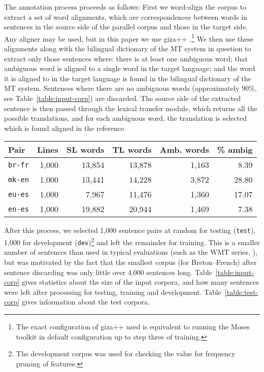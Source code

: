 \documentclass[11pt]{article}
\begin{document}
The annotation process proceeds as follows: First we word-align the
corpus to extract a set of word alignments, which are correspondences
between words in sentences in the source side of the parallel corpus
and those in the target side. Any aligner may be used, but in this
paper we use {\sc giza++} \citep{och03a}.\footnote{The exact
  configuration of {\sc giza++} used is equivalent to running the {\sc
    Moses} toolkit \citep{koehn07} in default configuration up to step
  three of training.}  We then use
these alignments along with the bilingual dictionary of the MT system
in question to extract only those sentences where: there is at least
one ambiguous word; that ambiguous word is aligned to a single word in
the target language; and the word it is aligned to in the target
language is found in the bilingual dictionary of the MT
system. Sentences where there are no ambiguous words (approximately
90\%, see Table~\ref{table:input-corp}) are discarded. The source side
of the extracted sentence is then passed through the lexical transfer
module, which returns all the possible translations, and for each
ambiguous word, the translation is selected which is found aligned in
the reference.

\begin{table*}
\begin{center}
 \begin{tabular}{|l|r|r|r|r|r|}
    \hline 
    {\bf Pair}      & {\bf Lines} & {\bf SL words} & {\bf TL words} & {\bf Amb. words} & {\bf \% ambig} \\ 
    \hline 
     \texttt{br-fr} & 1,000 & 13,854  & 13,878  & 1,163 & 8.39   \\
    \hline 
     \texttt{mk-en} & 1,000 & 13,441 & 14,228  & 3,872 & 28.80 \\
    \hline 
     \texttt{eu-es} & 1,000 & 7,967 & 11,476  & 1,360  & 17.07 \\
    \hline 
     \texttt{en-es} & 1,000 & 19,882 & 20,944  & 1,469  & 7.38 \\
    \hline 
 \end{tabular} 
\end{center}
 \caption{Statistics about the test corpora. The columns \textbf{amb.\ words} and \textbf{\%~ambig} gives 
    the number of word with more than one translation and the percentage of SL words which have 
    more than one translation respectively.}
  \label{table:test-corp}
\end{table*}

After this process, we selected 1,000 sentence pairs at random for
testing (\texttt{test}), 1,000 for development (\texttt{dev})\footnote{The development corpus  
  was used for checking the value for frequency pruning of features.} and 
left the remainder for training. This is a smaller
number of sentences than used in typical evaluations (such as the WMT
series, \cite{callisonburch2012}), but was motivated by the fact that
the smallest corpus (for Breton--French) after sentence discarding was
only little over 4,000 sentences long. Table~\ref{table:input-corp}
gives statistics about the size of the input corpora, and how many
sentences were left after processing for testing, training and
development. Table~\ref{table:test-corp} gives information about the
test corpora.
\end{document}
